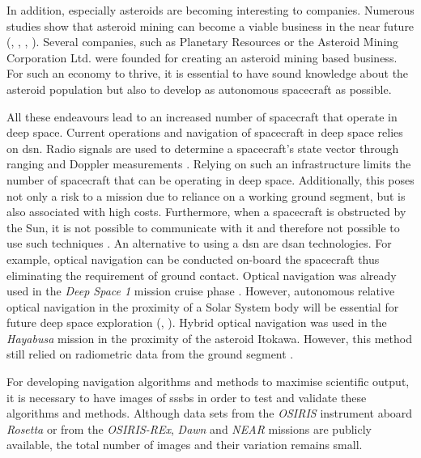In addition, especially asteroids are becoming interesting to companies. Numerous studies show that asteroid mining can become a viable business in the near future (\cite{andrews2015defining}, \cite{busch2004profitable}, \cite{weinzierl2018EconomicFrontier}, \cite{pittman2017deep}). Several companies, such as Planetary Resources \cite{lewicki2013planetary} or the Asteroid Mining Corporation Ltd. \cite{asteroidminingcorporation} were founded for creating an asteroid mining based business. For such an economy to thrive, it is essential to have sound knowledge about the asteroid population but also to develop as autonomous spacecraft as possible.

All these endeavours lead to an increased number of spacecraft that operate in deep space. Current operations and navigation of spacecraft in deep space relies on \gls{dsn}. Radio signals are used to determine a spacecraft's state vector through ranging and Doppler measurements \cite{ramamurthy2015delta}. Relying on such an infrastructure limits the number of spacecraft that can be operating in deep space. Additionally, this poses not only a risk to a mission due to reliance on a working ground segment, but is also associated with high costs. Furthermore, when a spacecraft is obstructed by the Sun, it is not possible to communicate with it and therefore not possible to use such techniques \cite{kominato2006optical}. An alternative to using a \gls{dsn} are \gls{dsan} technologies. For example, optical navigation can be conducted on-board the spacecraft thus eliminating the requirement of ground contact. Optical navigation was already used in the \textit{Deep Space 1} mission cruise phase \cite{Riedel2000AutonomousReport}. However, autonomous relative optical navigation in the proximity of a Solar System body will be essential for future deep space exploration (\cite{steffes2017deep}, \cite{martin2006jpl}). Hybrid optical navigation was used in the \textit{Hayabusa} mission in the proximity of the asteroid Itokawa. However, this method still relied on radiometric data from the ground segment \cite{kominato2006optical}.

For developing navigation algorithms and methods to maximise scientific output, it is necessary to have images of \gls{sssb}s in order to test and validate these algorithms and methods. Although data sets from the \textit{OSIRIS} instrument aboard \textit{Rosetta} \cite{osirisArchive} or from the \textit{OSIRIS-REx}, \textit{Dawn} and \textit{NEAR} missions \cite{palmer2014small} are publicly available, the total number of images and their variation remains small.

